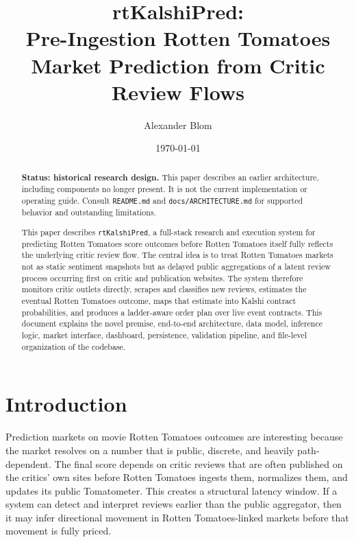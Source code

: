 \documentclass[11pt]{article}
\title{rtKalshiPred:\\
Pre-Ingestion Rotten Tomatoes Market Prediction from Critic Review Flows}
\author{Alexander Blom}
\date{\today}
\begin{document}
\maketitle

\begin{abstract}
\textbf{Status: historical research design.} This paper describes an earlier
architecture, including components no longer present. It is not the current
implementation or operating guide. Consult \texttt{README.md} and
\texttt{docs/ARCHITECTURE.md} for supported behavior and outstanding limitations.

This paper describes \texttt{rtKalshiPred}, a full-stack research and execution system for predicting Rotten Tomatoes score outcomes before Rotten Tomatoes itself fully reflects the underlying critic review flow. The central idea is to treat Rotten Tomatoes markets not as static sentiment snapshots but as delayed public aggregations of a latent review process occurring first on critic and publication websites. The system therefore monitors critic outlets directly, scrapes and classifies new reviews, estimates the eventual Rotten Tomatoes outcome, maps that estimate into Kalshi contract probabilities, and produces a ladder-aware order plan over live event contracts. This document explains the novel premise, end-to-end architecture, data model, inference logic, market interface, dashboard, persistence, validation pipeline, and file-level organization of the codebase.
\end{abstract}

\tableofcontents
\newpage

\section{Introduction}
Prediction markets on movie Rotten Tomatoes outcomes are interesting because the market resolves on a number that is public, discrete, and heavily path-dependent. The final score depends on critic reviews that are often published on the critics' own sites before Rotten Tomatoes ingests them, normalizes them, and updates its public Tomatometer. This creates a structural latency window. If a system can detect and interpret reviews earlier than the public aggregator, then it may infer directional movement in Rotten Tomatoes-linked markets before that movement is fully priced.
\end{document}
